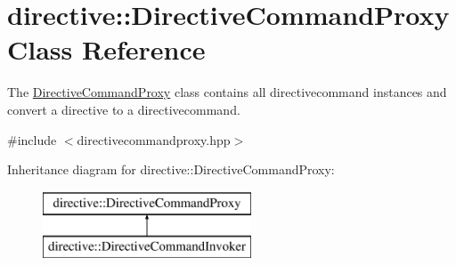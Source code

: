 \hypertarget{classdirective_1_1DirectiveCommandProxy}{}\section{directive\+:\+:Directive\+Command\+Proxy Class Reference}
\label{classdirective_1_1DirectiveCommandProxy}


The \hyperlink{classdirective_1_1DirectiveCommandProxy}{Directive\+Command\+Proxy} class contains all directivecommand instances and convert a directive to a directivecommand.  




{\ttfamily \#include $<$directivecommandproxy.\+hpp$>$}

Inheritance diagram for directive\+:\+:Directive\+Command\+Proxy\+:\begin{figure}[H]
\begin{center}
\leavevmode
\includegraphics[height=2.000000cm]{d4/def/classdirective_1_1DirectiveCommandProxy}
\end{center}
\end{figure}
